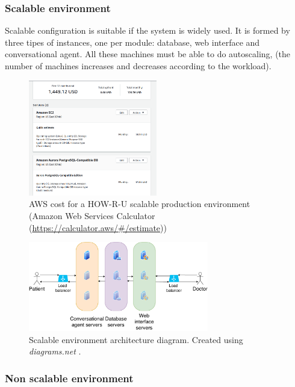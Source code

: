 \documentclass[12pt,english]{article}
\begin{document}
\subsubsection{Scalable environment}

Scalable configuration is suitable if the system is widely used. It is formed by three tipes of instances, one per module: database, web interface and conversational agent. All these machines must be able to do autoscaling, (the number of machines increases and decreases according to the workload).

\begin{figure}[H]
  \centering
  \includegraphics[width=0.5\textwidth]{cost.png}
  \caption{AWS cost for a HOW-R-U scalable production environment (Amazon Web Services Calculator (\href{https://calculator.aws/\#/estimate}{https://calculator.aws/\#/estimate}))}
\end{figure}

\begin{figure}[H]
  \centering
  \includegraphics[width=0.7\textwidth]{scalable.pdf}
  \caption{Scalable environment architecture diagram. Created using \emph{diagrams.net} \protect\cite{drawio}.}
\end{figure}

\subsubsection{Non scalable environment}
\end{document}
